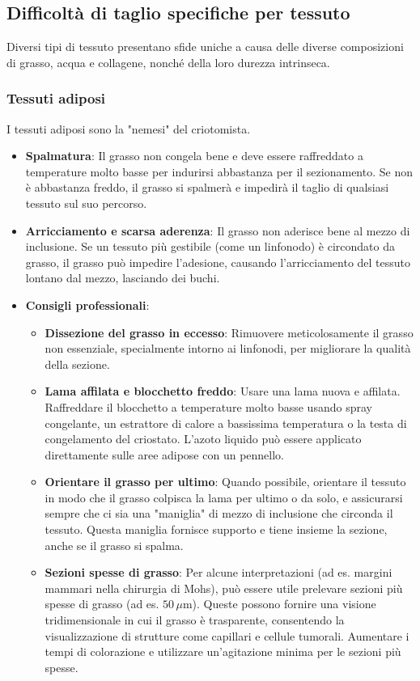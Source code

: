 \subsection{Difficoltà di taglio specifiche per tessuto}

Diversi tipi di tessuto presentano sfide uniche a causa delle diverse composizioni di grasso, acqua e collagene, nonché della loro durezza intrinseca. 

\subsubsection{Tessuti adiposi}
I tessuti adiposi sono la "nemesi" del criotomista.
\begin{itemize}
    \item   \textbf{Spalmatura}: Il grasso non congela bene e deve essere raffreddato a temperature molto basse per indurirsi abbastanza per il sezionamento.  Se non è abbastanza freddo, il grasso si spalmerà e impedirà il taglio di qualsiasi tessuto sul suo percorso. 
    \item   \textbf{Arricciamento e scarsa aderenza}: Il grasso non aderisce bene al mezzo di inclusione.  Se un tessuto più gestibile (come un linfonodo) è circondato da grasso, il grasso può impedire l'adesione, causando l'arricciamento del tessuto lontano dal mezzo, lasciando dei buchi. 
    \item   \textbf{Consigli professionali}:
    \begin{itemize}
        \item   \textbf{Dissezione del grasso in eccesso}: Rimuovere meticolosamente il grasso non essenziale, specialmente intorno ai linfonodi, per migliorare la qualità della sezione. 
        \item   \textbf{Lama affilata e blocchetto freddo}: Usare una lama nuova e affilata.  Raffreddare il blocchetto a temperature molto basse usando spray congelante, un estrattore di calore a bassissima temperatura o la testa di congelamento del criostato.  L'azoto liquido può essere applicato direttamente sulle aree adipose con un pennello. 
        \item   \textbf{Orientare il grasso per ultimo}: Quando possibile, orientare il tessuto in modo che il grasso colpisca la lama per ultimo o da solo, e assicurarsi sempre che ci sia una "maniglia" di mezzo di inclusione che circonda il tessuto.  Questa maniglia fornisce supporto e tiene insieme la sezione, anche se il grasso si spalma. 
        \item   \textbf{Sezioni spesse di grasso}: Per alcune interpretazioni (ad es. margini mammari nella chirurgia di Mohs), può essere utile prelevare sezioni più spesse di grasso (ad es. $50\,\mu\text{m}$).  Queste possono fornire una visione tridimensionale in cui il grasso è trasparente, consentendo la visualizzazione di strutture come capillari e cellule tumorali.  Aumentare i tempi di colorazione e utilizzare un'agitazione minima per le sezioni più spesse. 

\end{itemize}
\end{itemize}
